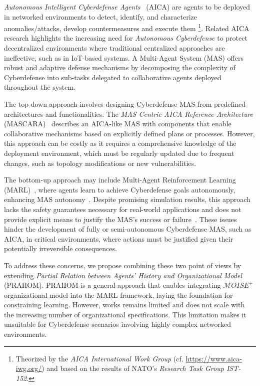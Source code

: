 \documentclass[conference]{IEEEtran}
\begin{document}
\textit{Autonomous Intelligent Cyberdefense Agents}~\cite{Kott2023} (AICA) are agents to be deployed in networked environments to detect, identify, and characterize anomalies/attacks, develop countermeasures and execute them
%
\footnote{
    Theorized by the \textit{AICA International Work Group} (cf. \url{https://www.aica-iwg.org/}) and based on the results of NATO's \textit{Research Task Group IST-152}.
}.
Related AICA research highlights the increasing need for \textit{Autonomous Cyberdefense} to protect decentralized environments where traditional centralized approaches are ineffective, such as in IoT-based systems. A Multi-Agent System (MAS) offers robust and adaptive defense mechanisms by decomposing the complexity of Cyberdefense into sub-tasks delegated to collaborative agents deployed throughout the system.

The top-down approach involves designing Cyberdefense MAS from predefined architectures and functionalities. The \textit{MAS Centric AICA Reference Architecture} (MASCARA)~\cite{Kott2023} describes an AICA-like MAS with components that enable collaborative mechanisms based on explicitly defined plans or processes. However, this approach can be costly as it requires a comprehensive knowledge of the deployment environment, which must be regularly updated due to frequent changes, such as topology modifications or new vulnerabilities.

The bottom-up approach may include Multi-Agent Reinforcement Learning (MARL)~\cite{Albrecht2024}, where agents learn to achieve Cyberdefense goals autonomously, enhancing MAS autonomy~\cite{hammar_stadle4_noms_23}. Despite promising simulation results, this approach lacks the safety guarantees necessary for real-world applications and does not provide explicit means to justify the MAS's success or failure~\cite{dulacarnold2019}. These issues hinder the development of fully or semi-autonomous Cyberdefense MAS, such as AICA, in critical environments, where actions must be justified given their potentially irreversible consequences.

To address these concerns, we propose combining these two point of views by extending \textit{Partial Relation between Agents' History and Organizational Model}~\cite{soule2024} (PRAHOM). PRAHOM is a general approach that enables integrating $\mathcal{M}OISE^+$ organizational model into the MARL framework, laying the foundation for constraining learning. However, works remains limited and does not scale with the increasing number of organizational specifications. This limitation makes it unsuitable for Cyberdefense scenarios involving highly complex networked environments.
\end{document}
